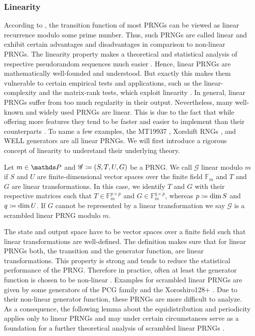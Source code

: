 \documentclass{stdlocal}
\begin{document}
  \subsubsection*{Linearity}
  According to \textcite{lecuyer2015}, the transition function of most PRNGs can be viewed as linear recurrence modulo some prime number.
  Thus, such PRNGs are called linear and exhibit certain advantages and disadvantages in comparison to non-linear PRNGs.
  The linearity property makes a theoretical and statistical analysis of respective pseudorandom sequences much easier \autocite{lecuyer2015,blackman2019,bauke2007}.
  Hence, linear PRNGs are mathematically well-founded and understood.
  But exactly this makes them vulnerable to certain empirical tests and applications, such as the linear-complexity and the matrix-rank tests, which exploit linearity \autocite{lecuyer2015,oneill2014,lemire2019}.
  In general, linear PRNGs suffer from too much regularity in their output.
  Nevertheless, many well-known and widely used PRNGs are linear.
  This is due to the fact that while offering more features they tend to be faster and easier to implement than their counterparts \autocite{lecuyer2015,blackman2019}.
  To name a few examples, the MT19937 \autocite{matsumoto1998}, Xorshift RNGs \autocite{marsaglia2003,vigna2016,vigna2017}, and WELL generators \autocite{panneton2006} are all linear PRNGs.
  We will first introduce a rigorous concept of linearity to understand their underlying theory.

  \begin{definition}
    Let $m\in\setPrime$ and $\mathscr{G}\coloneqq(S,T,U,G)$ be a PRNG.
    We call $\mathscr{G}$ linear modulo $m$ if $S$ and $U$ are finite-dimensional vector spaces over the finite field $\mathds{F}_m$ and $T$ and $G$ are linear transformations.
    In this case, we identify $T$ and $G$ with their respective matrices such that $T \in \mathds{F}_m^{p\times p}$ and $G \in \mathds{F}_m^{q\times p}$, whereas $p\coloneqq\dim S$ and $q\coloneqq\dim U$.
    If $G$ cannot be represented by a linear transformation we say $\mathscr{G}$ is a scrambled linear PRNG modulo $m$.
  \end{definition}
  The state and output space have to be vector spaces over a finite field such that linear transformations are well-defined.
  The definition makes sure that for linear PRNGs both, the transition and the generator function, are linear transformations.
  This property is strong and tends to reduce the statistical performance of the PRNG.
  Therefore in practice, often at least the generator function is chosen to be non-linear \autocite{blackman2019}.
  Examples for scrambled linear PRNGs are given by some generators of the PCG family \autocite{oneill2014} and the Xoroshiro128+ \autocite{blackman2019}.
  Due to their non-linear generator function, these PRNGs are more difficult to analyze.
  As a consequence, the following lemma about the equidistribution and periodicity applies only to linear PRNGs and may under certain circumstances serve as a foundation for a further theoretical analysis of scrambled linear PRNGs \autocite{lecuyer2015,bauke2007}.
\end{document}
